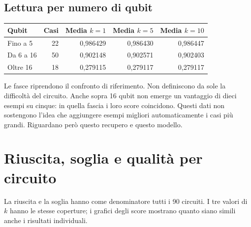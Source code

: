 \documentclass[a4paper,10pt]{article}
\begin{document}
\subsection{Lettura per numero di qubit}
\begingroup\small\renewcommand{\arraystretch}{1.18}\setlength{\tabcolsep}{5pt}
\begin{tabularx}{\linewidth}{Xrrrr}\toprule
Qubit & Casi & Media $k=1$ & Media $k=5$ & Media $k=10$\\\midrule
Fino a 5 & 22 & 0,986429 & 0,986430 & 0,986447\\
Da 6 a 16 & 50 & 0,902148 & 0,902571 & 0,902403\\
Oltre 16 & 18 & 0,279115 & 0,279117 & 0,279117\\
\bottomrule\end{tabularx}\endgroup\par
Le fasce riprendono il confronto di riferimento. Non definiscono da sole
la difficoltà del circuito. Anche sopra 16 qubit non emerge un vantaggio di
dieci esempi su cinque: in quella fascia i loro score coincidono. Questi dati
non sostengono l'idea che aggiungere esempi migliori automaticamente i casi
più grandi. Riguardano però questo recupero e questo modello.
\clearpage\section{Riuscita, soglia e qualità per circuito}
La riuscita e la soglia hanno come denominatore tutti i 90 circuiti.
I tre valori di $k$ hanno le stesse coperture; i grafici degli score mostrano
quanto siano simili anche i risultati individuali.\par\begin{center}\end{center}
\end{document}
